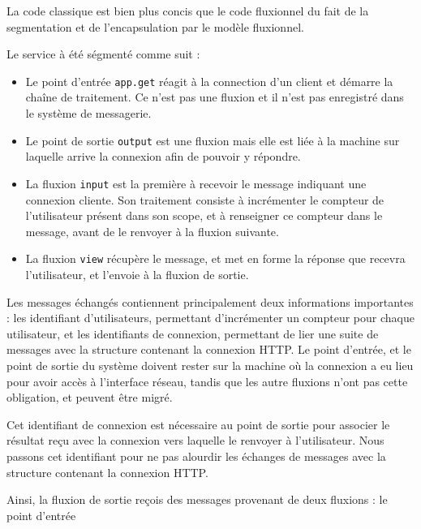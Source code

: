 La code classique est bien plus concis que le code fluxionnel du fait de la segmentation et de l'encapsulation  par le modèle fluxionnel.

Le service à été ségmenté comme suit :
\begin{itemize}
  \item Le point d'entrée \texttt{app.get} réagit à la connection d'un client et démarre la chaîne de traitement.
  Ce n'est pas une fluxion et il n'est pas enregistré dans le système de messagerie.
  \item Le point de sortie \texttt{output} est une fluxion mais elle est liée à la machine sur laquelle arrive la connexion afin de pouvoir y répondre.
  \item La fluxion \texttt{input} est la première à recevoir le message indiquant une connexion cliente. Son traitement consiste à incrémenter le compteur de l'utilisateur présent dans son scope, et à renseigner ce compteur dans le message, avant de le renvoyer à la fluxion suivante.
  \item La fluxion \texttt{view} récupère le message, et met en forme la réponse que recevra l'utilisateur, et l'envoie à la fluxion de sortie.
\end{itemize}

Les messages échangés contiennent principalement deux informations importantes : les identifiant d'utilisateurs, permettant d'incrémenter un compteur pour chaque utilisateur, et les identifiants de connexion, permettant de lier une suite de messages avec la structure contenant la connexion HTTP.
Le point d'entrée, et le point de sortie du système doivent rester sur la machine où la connexion a eu lieu pour avoir accès à l'interface réseau, tandis que les autre fluxions n'ont pas cette obligation, et peuvent être migré.

Cet identifiant de connexion est nécessaire au point de sortie pour associer le résultat reçu avec la connexion vers laquelle le renvoyer à l'utilisateur.
Nous passons cet identifiant pour ne pas alourdir les échanges de messages avec la structure contenant la connexion HTTP.

Ainsi, la fluxion de sortie reçois des messages provenant de deux fluxions : le point d'entrée




